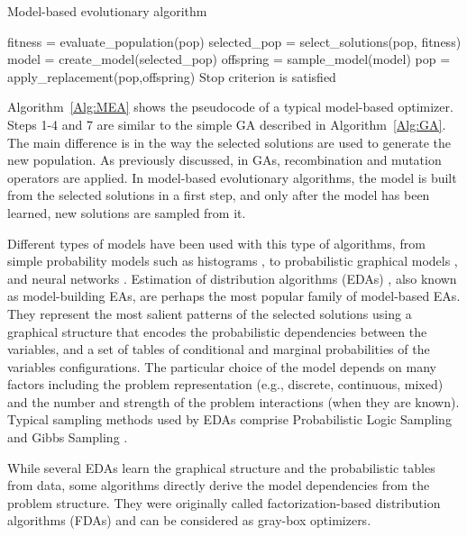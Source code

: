  
 \begin{algorithm}[ht!]
  \caption{Model-based evolutionary algorithm}
  \begin{algorithmic}[1]
      \REPEAT 
         \STATE  fitness = evaluate\_population(pop)
         \STATE  selected\_pop = select\_solutions(pop, fitness)
         \STATE  model = create\_model(selected\_pop)
         \STATE  offspring = sample\_model(model)
         \STATE  pop =  apply\_replacement(pop,offspring)       
       \UNTIL Stop criterion is satisfied		
     \end{algorithmic}
	
 \label{Alg:MEA}
 \end{algorithm}
 
 Algorithm~\ref{Alg:MEA} shows the pseudocode of a typical model-based optimizer. Steps 1-4 and 7 are similar to the simple GA described in Algorithm~\ref{Alg:GA}. The main difference is in the way the selected solutions are used to generate the new population. As previously discussed, in GAs, recombination and mutation operators are applied. In model-based evolutionary algorithms, the model is built from the selected solutions in a first step, and only after the model has been learned, new solutions are sampled from it.

 
 Different types  of models have been used with this type of algorithms, from simple probability models such as histograms \cite{Tsutsui_et_al:2001}, to probabilistic graphical models \cite{Larranaga_et_al:2012}, and  neural networks \cite{Marti_et_al:2008}. Estimation of distribution algorithms (EDAs)  \cite{Muhlenbein_and_Paas:1996r,Larranaga_et_al:2012}, also known as model-building EAs,  are perhaps the most popular family of model-based EAs. They represent the most salient patterns of the selected solutions using a graphical structure that encodes the probabilistic dependencies between the variables, and a set of tables of conditional and marginal probabilities of the variables configurations. The particular choice of the model depends on many factors including the problem representation (e.g., discrete, continuous, mixed) and the number and strength of the problem interactions (when they are known). Typical sampling methods used by EDAs comprise Probabilistic Logic Sampling and Gibbs Sampling \cite{Shakya_and_Santana:2012}.

 While several EDAs learn the graphical structure and the probabilistic tables from data, some algorithms directly derive the model dependencies from  the problem structure. They were originally called factorization-based distribution algorithms (FDAs) \cite{Muhlenbein_et_al:1999} and can be considered as gray-box optimizers. 

